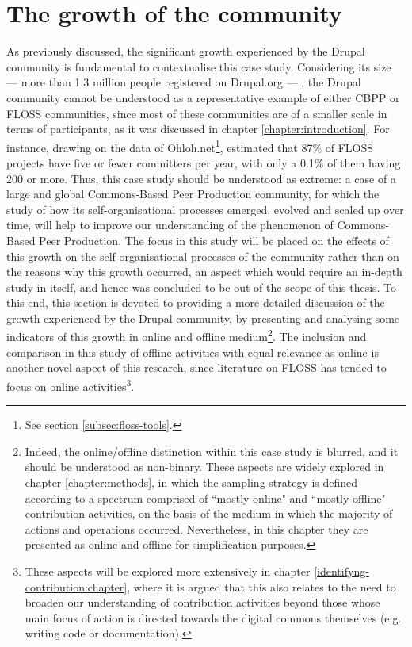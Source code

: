 \section{The growth of the community}
\label{sec:growth-community}

As previously discussed, the significant growth experienced by the Drupal community is fundamental to contextualise this case study. Considering its size --- more than 1.3 million people registered on Drupal.org --- , the Drupal community cannot be understood as a representative example of either CBPP or FLOSS communities, since most of these communities are of a smaller scale in terms of participants, as it was discussed in chapter \ref{chapter:introduction}. For instance, drawing on the data of Ohloh.net\footnote{See section \ref{subsec:floss-tools}.}, \textcite{oss-size:2017:Online} estimated that 87\% of FLOSS projects have five or fewer committers per year, with only a 0.1\% of them having 200 or more. Thus, this case study should be understood as extreme: a case of a large and global Commons-Based Peer Production community, for which the study of how its self-organisational processes emerged, evolved and scaled up over time, will help to improve our understanding of the phenomenon of Commons-Based Peer Production. The focus in this study will be placed on the effects of this growth on the self-organisational processes of the community rather than on the reasons why this growth occurred, an aspect which would require an in-depth study in itself, and hence was concluded to be out of the scope of this thesis. To this end, this section is devoted to providing a more detailed discussion of the growth experienced by the Drupal community, by presenting and analysing some indicators of this growth in online and offline medium\footnote{Indeed, the online\slash offline distinction within this case study is blurred, and it should be understood as non-binary. These aspects are widely explored in chapter \ref{chapter:methods}, in which the sampling strategy is defined according to a spectrum comprised of ``mostly-online" and ``mostly-offline" contribution activities, on the basis of the medium in which the majority of actions and operations occurred. Nevertheless, in this chapter they are presented as online and offline for simplification purposes.}. The inclusion and comparison in this study of offline activities with equal relevance as online is another novel aspect of this research, since literature on FLOSS has tended to focus on online activities\footnote{These aspects will be explored more extensively in chapter \ref{identifyng-contribution:chapter}, where it is argued that this also relates to the need to broaden our understanding of contribution activities beyond those whose main focus of action is directed towards the digital commons themselves (e.g. writing code or documentation).}.

